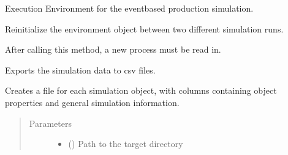\documentclass[letterpaper,10pt,english]{sphinxmanual}
\begin{document}
\begin{fulllineitems}
\label{\detokenize{source/API/api:environment.Environment}}
\sphinxAtStartPar
Execution Environment for the event\sphinxhyphen{}based production simulation.

\begin{fulllineitems}
\label{\detokenize{source/API/api:environment.Environment.clear_env}}
\sphinxAtStartPar
Reinitialize the environment object between two different simulation runs.

\sphinxAtStartPar
After calling this method, a new process must be read in.

\end{fulllineitems}


\begin{fulllineitems}
\label{\detokenize{source/API/api:environment.Environment.data_to_csv}}
\sphinxAtStartPar
Exports the simulation data to csv files.

\sphinxAtStartPar
Creates a file for each simulation object, with columns containing object properties and general simulation
information.
\begin{quote}\begin{description}
\item[{Parameters}] \leavevmode\begin{itemize}
\item {} 
\sphinxAtStartPar
{} () \textendash{} Path to the target directory


\end{itemize}
\end{description}
\end{quote}
\end{fulllineitems}
\end{fulllineitems}
\end{document}

